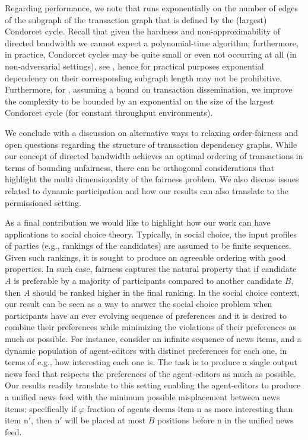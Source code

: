 Regarding performance, we note that \TaxisWL runs exponentially on the number of edges of the subgraph of the transaction graph that is defined by the (largest) Condorcet cycle.
%
Recall that given the hardness and non-approximability of directed bandwidth we cannot expect a polynomial-time algorithm; furthermore, in practice, Condorcet cycles may be quite small or even not occurring at all (in non-adversarial settings), see \cite{CCS:KDLJK23}, hence for practical purposes exponential dependency on their corresponding subgraph length may not be prohibitive.
%
Furthermore, for \Taxis, assuming a \txDelay bound on transaction dissemination, we improve the complexity to be bounded by an exponential on the size of the largest Condorcet cycle (for constant throughput environments).

We conclude with a discussion on alternative ways to relaxing order-fairness and open questions regarding the structure of transaction dependency graphs.
%
While our concept of directed bandwidth achieves an optimal ordering of transactions in terms of bounding unfairness, there can be orthogonal considerations that highlight the multi dimensionality of the fairness problem.
%
We also discuss issues related to dynamic participation and how our results can also translate to the permissioned setting.

As a final contribution we would like to highlight how our work can have applications  to social choice theory.
%
Typically, in social choice, the input profiles of parties (e.g., rankings of the candidates) are assumed to be finite sequences.
%
Given such rankings, it is sought to produce an agreeable ordering with good properties.
%
In such case, fairness captures the natural property that if candidate $A$ is preferable by a majority of participants compared to another candidate $B$, then $A$ should be ranked higher in the final ranking.
%
In the social choice context, our result can be seen as a way to answer the social choice problem when participants have an ever evolving sequence of preferences and  it is desired to combine their preferences while minimizing the violations of their preferences as much as possible.
%
For instance, consider an infinite sequence of news items, and a dynamic population of agent-editors with distinct preferences for each one, in terms of e.g., how interesting each one is.
%
The task is to produce a single output news feed that respects the preferences of the agent-editors as much as possible.
%
Our results readily translate to this setting enabling the agent-editors to produce a unified news feed with the minimum possible misplacement between news items: specifically if $\varphi$ fraction of agents deems item $\mathrm{n}$ as more interesting than item $\mathrm{n'}$, then $\mathrm{n'}$ will be placed at most $B$ positions before $\mathrm{n}$ in the unified news feed.
